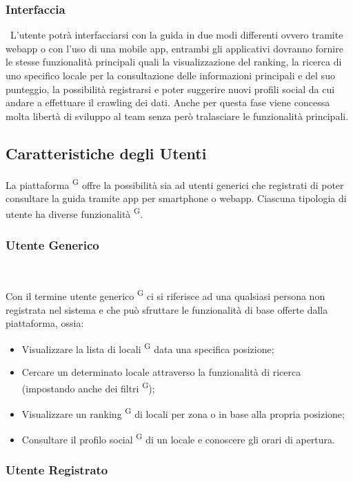 \documentclass[letterpaper]{article}
\begin{document}
\subsubsection{Interfaccia} \ 
L’utente potrà interfacciarsi con la guida in due modi differenti ovvero tramite webapp o con l’uso di una mobile app, entrambi gli applicativi dovranno fornire le stesse funzionalità principali quali la visualizzazione del ranking, la ricerca di uno specifico locale per la consultazione delle informazioni principali e del suo punteggio, la possibilità registrarsi e poter suggerire nuovi profili social da cui andare a effettuare il crawling dei dati.
Anche per questa fase viene concessa molta libertà di sviluppo al team senza però tralasciare le funzionalità principali.

\subsection{Caratteristiche degli Utenti}

La piattaforma \textsuperscript{G} offre la possibilità sia ad utenti generici che registrati di poter consultare la guida tramite app per smartphone o webapp. Ciascuna tipologia di utente ha diverse funzionalità \textsuperscript{G}.

\subsubsection{Utente Generico} \ 

Con il termine utente generico \textsuperscript{G} ci si riferisce ad una qualsiasi persona non registrata nel sistema e che può sfruttare le funzionalità di base offerte dalla piattaforma, ossia:

\begin{itemize}
  \item Visualizzare la lista di locali \textsuperscript{G} data una specifica posizione;
  \item Cercare un determinato locale attraverso la funzionalità di ricerca (impostando anche dei filtri \textsuperscript{G});
  \item Visualizzare un ranking \textsuperscript{G} di locali per zona o in base alla propria posizione;
  \item Consultare il profilo social \textsuperscript{G} di un locale e conoscere gli orari di apertura.
\end{itemize}

\subsubsection{Utente Registrato} \ 
\end{document}
